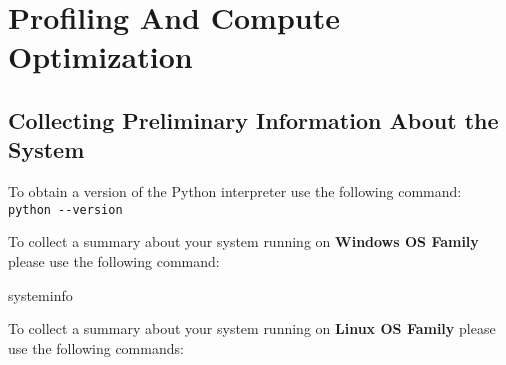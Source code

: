 \documentclass[
]{article}
\newenvironment{Shaded}{}{}
\newcommand{\AttributeTok}[1]{\textcolor[rgb]{0.49,0.56,0.16}{#1}}
\newcommand{\BuiltInTok}[1]{#1}
\newcommand{\CommentTok}[1]{\textcolor[rgb]{0.38,0.63,0.69}{\textit{#1}}}
\newcommand{\ExtensionTok}[1]{#1}
\newcommand{\FunctionTok}[1]{\textcolor[rgb]{0.02,0.16,0.49}{#1}}
\newcommand{\NormalTok}[1]{#1}
\newcommand{\StringTok}[1]{\textcolor[rgb]{0.25,0.44,0.63}{#1}}
\newcommand{\VariableTok}[1]{\textcolor[rgb]{0.10,0.09,0.49}{#1}}
\begin{document}
\hypertarget{profiling-and-compute-optimization}{%
\section{Profiling And Compute
Optimization}\label{profiling-and-compute-optimization}}

\hypertarget{collecting-preliminary-information-about-the-system}{%
\subsection{Collecting Preliminary Information About the
System}\label{collecting-preliminary-information-about-the-system}}

To obtain a version of the Python interpreter use the following
command:\\
\texttt{python\ -\/-version}

To collect a summary about your system running on \textbf{Windows OS
Family} please use the following command:

\begin{Shaded}
\begin{Highlighting}[]
\ExtensionTok{systeminfo}
\end{Highlighting}
\end{Shaded}

To collect a summary about your system running on \textbf{Linux OS
Family} please use the following commands:

\begin{Shaded}
\end{Shaded}
\end{document}
